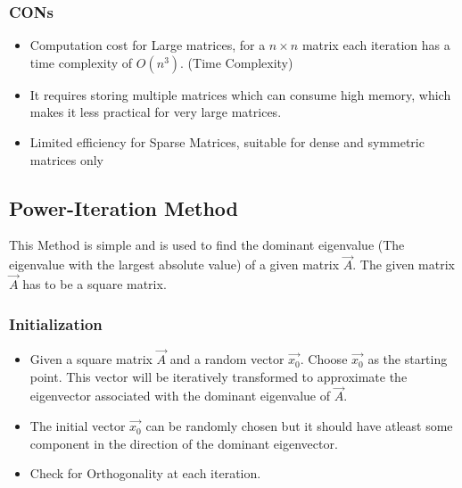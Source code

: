 \documentclass[journal]{IEEEtran}
\begin{document}
\subsubsection{CONs}
\begin{itemize}
    \item Computation cost for Large matrices, for a $n \times n$ matrix each iteration has a time complexity of $O(n^3)$. (Time Complexity)
    \item It requires storing multiple matrices which can consume high memory, which makes it less practical for very large matrices.
    \item Limited efficiency for Sparse Matrices, suitable for dense and symmetric matrices only 
\end{itemize}
\subsection{\textbf{Power-Iteration Method}}
This Method is simple and is used to find the dominant eigenvalue (The eigenvalue with the largest absolute value) of a given matrix $\vec{A}$. The given matrix $\vec{A}$ has to be a square matrix.\\
\subsubsection{Initialization}
\begin{itemize}
    \item Given a square matrix $\vec{A}$ and a random vector $\vec{x_{0}}$. Choose $\vec{x_0}$ as the starting point. This vector will be iteratively transformed to approximate the eigenvector associated with the dominant eigenvalue of $\vec{A}$.
    \item The initial vector $\vec{x_0}$ can be randomly chosen but it should have atleast some component in the direction of the dominant eigenvector.
    \item Check for Orthogonality at each iteration.\\ 
\end{itemize}
\end{document}
